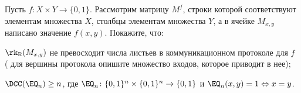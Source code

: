 Пусть $f\colon X \times Y \to \{0, 1\}$. Рассмотрим матрицу $M^f$, строки которой соответствуют элементам
множества $X$, столбцы элементам множества $Y$, а в ячейке $M_{x, y}$ написано значение $f(x,
y)$. Покажите, что:
\begin{enumcyr}
    \item $\rk_{\mathbb{R}}(M_{x, y})$ не превосходит числа листьев в коммуникационном протоколе для $f$
        ( для вершины протокола опишите множество входов, которое приводит в нее);
    \item $\DCC(\EQ_{n}) \ge n$, где $\EQ_{n}\colon \{0, 1\}^n \times \{0, 1\}^n \to \{0, 1\}$ и $\EQ_n(x, y) = 1
        \Leftrightarrow x = y$. 
\end{enumcyr}